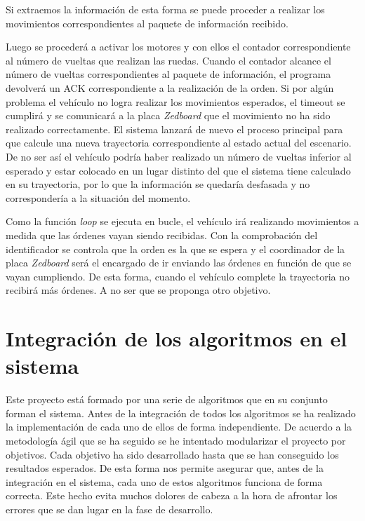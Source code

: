 Si extraemos la información de esta forma se puede proceder a realizar los movimientos correspondientes al paquete de información recibido.

Luego se procederá a activar los motores y con ellos el contador correspondiente al número de vueltas que realizan las ruedas. Cuando el contador alcance el número de vueltas correspondientes al paquete de información, el programa devolverá un \ac{ACK} correspondiente a la realización de la orden. Si por algún problema el vehículo no logra realizar los movimientos esperados, el timeout se cumplirá y se comunicará a la placa \emph{Zedboard} que el movimiento no ha sido realizado correctamente. El sistema lanzará de nuevo el proceso principal para que calcule una nueva trayectoria correspondiente al estado actual del escenario. De no ser así el vehículo podría haber realizado un número de vueltas inferior al esperado y estar colocado en un lugar distinto del que el sistema tiene calculado en su trayectoria, por lo que la información se quedaría desfasada y no correspondería a la situación del momento.

Como la función \emph{loop} se ejecuta en bucle, el vehículo irá realizando movimientos a medida que las órdenes vayan siendo recibidas. Con la comprobación del identificador se controla que la orden es la que se espera y el coordinador de la placa \emph{Zedboard} será el encargado de ir enviando las órdenes en función de que se vayan cumpliendo. De esta forma, cuando el vehículo complete la trayectoria no recibirá más órdenes. A no ser que se proponga otro objetivo.

\section{Integración de los algoritmos en el sistema}\label{sec:Integracion}

Este proyecto está formado por una serie de algoritmos que en su conjunto forman el sistema. Antes de la integración de todos los algoritmos se ha realizado la implementación de cada uno de ellos de forma independiente. De acuerdo a la metodología ágil que se ha seguido se he intentado modularizar el proyecto por objetivos. Cada objetivo ha sido desarrollado hasta que se han conseguido los resultados esperados. De esta forma nos permite asegurar que, antes de la integración en el sistema, cada uno de estos algoritmos funciona de forma correcta. Este hecho evita muchos dolores de cabeza a la hora de afrontar los errores que se dan lugar en la fase de desarrollo.

